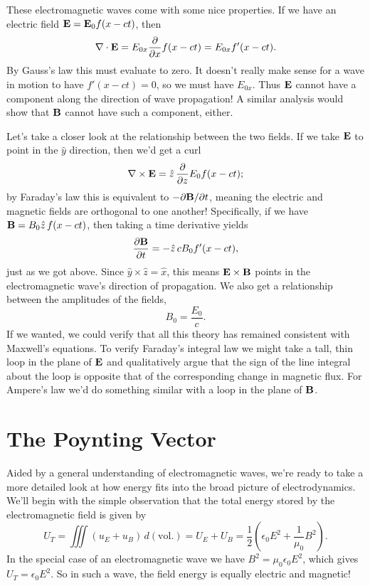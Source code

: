 \documentclass[../p051main.tex]{subfiles}
\begin{document}
These electromagnetic waves come with some nice properties.
If we have an electric field $\mathbf{E} = \mathbf{E}_0 f(x - ct)$, then
\[ \nabla \cdot \mathbf{E} = E_{0x} \frac{\partial}{\partial x} f(x - ct) = E_{0x} f'(x - ct). \]
By Gauss's law this must evaluate to zero.
It doesn't really make sense for a wave in motion to have $f'(x - ct) = 0$, so we must have $E_{0x}$.
Thus $\mathbf{E}$ cannot have a component along the direction of wave propagation!
A similar analysis would show that $\mathbf{B}$ cannot have such a component, either.

Let's take a closer look at the relationship between the two fields.
If we take $\mathbf{E}$ to point in the $\hat y$ direction, then we'd get a curl
\[ \nabla \times \mathbf{E} = \hat z \,\frac{\partial}{\partial z} E_0 f(x - ct); \]
by Faraday's law this is equivalent to $-\partial \mathbf{B} / \partial t$, meaning the electric and magnetic fields are orthogonal to one another!
Specifically, if we have $\mathbf{B} = B_0 \hat z \,f(x - ct)$, then taking a time derivative yields
\[ \frac{\partial \mathbf{B}}{\partial t} = -\hat z \,cB_0 f'(x - ct), \]
just as we got above.
Since $\hat y \times \hat z = \hat x$, this means $\mathbf{E} \times \mathbf{B}$ points in the electromagnetic wave's direction of propagation.
We also get a relationship between the amplitudes of the fields,
\[ B_0 = \frac{E_0}{c}. \]
If we wanted, we could verify that all this theory has remained consistent with Maxwell's equations.
To verify Faraday's integral law we might take a tall, thin loop in the plane of $\mathbf{E}$ and qualitatively argue that the sign of the line integral about the loop is opposite that of the corresponding change in magnetic flux.
For Ampere's law we'd do something similar with a loop in the plane of $\mathbf{B}$.

\section{The Poynting Vector}
Aided by a general understanding of electromagnetic waves, we're ready to take a more detailed look at how energy fits into the broad picture of electrodynamics.
We'll begin with the simple observation that the total energy stored by the electromagnetic field is given by
\[ U_T = \iiint(u_E + u_B) \,d(\textrm{vol.}) = U_E + U_B = \frac{1}{2} \left( \epsilon_0 E^2 + \frac{1}{\mu_0} B^2 \right). \]
In the special case of an electromagnetic wave we have $B^2 = \mu_0 \epsilon_0 E^2$, which gives $U_T = \epsilon_0 E^2$.
So in such a wave, the field energy is equally electric and magnetic!
\end{document}
